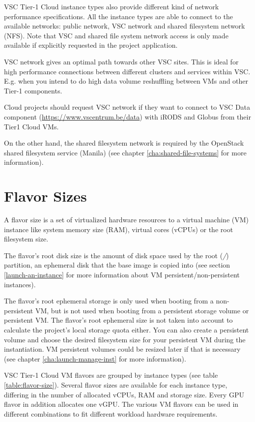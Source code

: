 VSC Tier-1 Cloud instance types also provide different kind of network
performance specifications. All the instance types are able to connect
to the available networks: public network, VSC network and shared filesystem
network (NFS). Note that VSC and shared file system network access is only made available
if explicitly requested in the project application.

VSC network gives an optimal path towards other VSC sites. This is ideal for high
performance connections between different clusters and services within VSC.
E.g. when you intend to do high data volume reshuffling between VMs and other Tier-1 components.

 Cloud projects should request VSC network if they want to
connect to VSC Data component (\url{https://www.vscentrum.be/data}) with iRODS
and Globus from their Tier1 Cloud VMs.

On the other hand, the shared filesystem network is required by the OpenStack
shared filesystem service (Manila) (see chapter \ref{cha:shared-file-systems}
for more information).


\section{Flavor Sizes}\label{sec:flavor-sizes}
A flavor size is a set of virtualized hardware resources to a virtual
machine (VM) instance like system memory size (RAM), virtual cores (vCPUs)
or the root filesystem size. 

The flavor's root disk size is the amount of disk space
used by the root (\emph{/}) partition, an ephemeral disk that the
base image is copied into (see section \ref{launch-an-instance} for
more information about VM persistent/non-persistent instances).

The flavor's root ephemeral storage is only used when booting from
a non-persistent VM, but is not used when booting from a persistent storage volume or
persistent VM.
The flavor's root ephemeral size is not taken into account to
calculate the project's local storage quota either. You can also
create a persistent volume and choose the desired filesystem size for
your persistent VM during the instantiation.
VM persistent volumes could be resized later if that is necessary
(see chapter \ref{cha:launch-manage-inst} for more information).

VSC Tier-1 Cloud VM flavors are grouped by instance types
(see table \ref{table:flavor-size}). Several flavor sizes are
available for each instance type, differing in the number of allocated vCPUs,
RAM and storage size. Every GPU flavor in addition allocates one vGPU.
The various VM flavors can be used in different
combinations to fit different workload hardware requirements.

